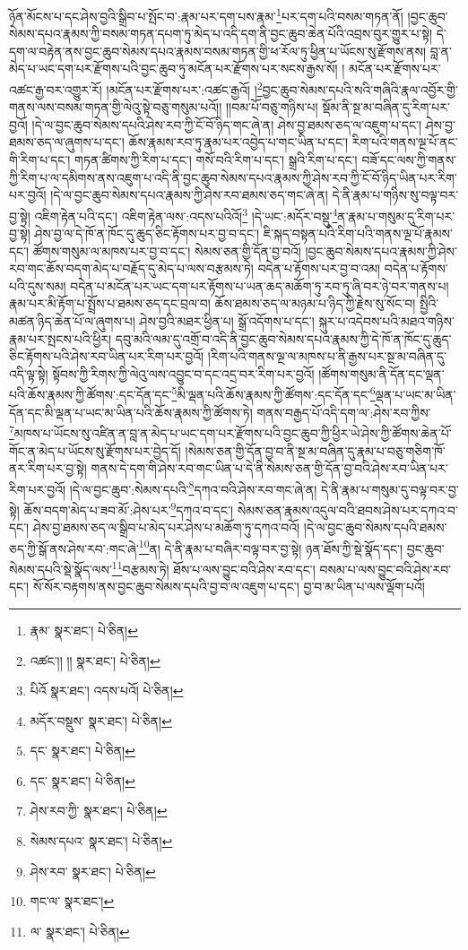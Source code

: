 ཉོན་མོངས་པ་དང་ཤེས་བྱའི་སྒྲིབ་པ་སྤོང་བ་:རྣམ་པར་དག་པས་རྣམ་\footnote{རྣམ་  སྣར་ཐང་།  པེ་ཅིན། }པར་དག་པའི་བསམ་གཏན་ནོ། །བྱང་ཆུབ་སེམས་དཔའ་རྣམས་ཀྱི་བསམ་གཏན་དཔག་ཏུ་མེད་པ་འདི་དག་ནི་བྱང་ཆུབ་ཆེན་པོའི་འབྲས་བུར་གྱུར་པ་སྟེ། དེ་དག་ལ་བརྟེན་ནས་བྱང་ཆུབ་སེམས་དཔའ་རྣམས་བསམ་གཏན་གྱི་ཕ་རོལ་ཏུ་ཕྱིན་པ་ཡོངས་སུ་རྫོགས་ནས། བླ་ན་མེད་པ་ཡང་དག་པར་རྫོགས་པའི་བྱང་ཆུབ་ཏུ་མངོན་པར་རྫོགས་པར་སངས་རྒྱས་སོ། །
མངོན་པར་རྫོགས་པར་འཚང་རྒྱ་བར་འགྱུར་རོ། །མངོན་པར་རྫོགས་པར་:འཚང་རྒྱའོ། །\footnote{འཚང་།། །།  སྣར་ཐང་།  པེ་ཅིན། }བྱང་ཆུབ་སེམས་དཔའི་སའི་གཞིའི་རྣལ་འབྱོར་གྱི་གནས་ལས་བསམ་གཏན་གྱི་ལེའུ་སྟེ་བཅུ་གསུམ་པའོ།། །།བམ་པོ་བཅུ་གཉིས་པ། སྡོམ་ནི་སྔ་མ་བཞིན་དུ་རིག་པར་བྱའོ། །དེ་ལ་བྱང་ཆུབ་སེམས་དཔའི་ཤེས་རབ་ཀྱི་ངོ་བོ་ཉིད་གང་ཞེ་ན། ཤེས་བྱ་ཐམས་ཅད་ལ་འཇུག་པ་དང་། ཤེས་བྱ་ཐམས་ཅད་ལ་ཞུགས་པ་དང་། ཆོས་རྣམས་རབ་ཏུ་རྣམ་པར་འབྱེད་པ་གང་ཡིན་པ་དང་། རིག་པའི་གནས་ལྔ་པོ་ནང་གི་རིག་པ་དང་། གཏན་ཚིགས་ཀྱི་རིག་པ་དང་། གསོ་བའི་རིག་པ་དང་། སྒྲའི་རིག་པ་དང་། བཟོ་དང་ལས་ཀྱི་གནས་ཀྱི་རིག་པ་ལ་དམིགས་ནས་འཇུག་པ་འདི་ནི་བྱང་ཆུབ་སེམས་དཔའ་རྣམས་ཀྱི་ཤེས་རབ་ཀྱི་ངོ་བོ་ཉིད་ཡིན་པར་རིག་པར་བྱའོ། །དེ་ལ་བྱང་ཆུབ་སེམས་དཔའ་རྣམས་ཀྱི་ཤེས་རབ་ཐམས་ཅད་གང་ཞེ་ན། དེ་ནི་རྣམ་པ་གཉིས་སུ་བལྟ་བར་བྱ་སྟེ། འཇིག་རྟེན་པའི་དང་། འཇིག་རྟེན་ལས་:འདས་པའིའོ།\footnote{པིའོ  སྣར་ཐང་། འདས་པའོ།  པེ་ཅིན། } །དེ་ཡང་:མདོར་བསྡུ་\footnote{མདོར་བསྡུས་  སྣར་ཐང་།  པེ་ཅིན། }ན་རྣམ་པ་གསུམ་དུ་རིག་པར་བྱ་སྟེ། ཤེས་བྱ་ལ་དེ་ཁོ་ན་ཁོང་དུ་ཆུད་ཅིང་རྟོགས་པར་བྱ་བ་དང་། ཇི་སྐད་བསྟན་པའི་རིག་པའི་གནས་ལྔ་པོ་རྣམས་དང་། ཚོགས་གསུམ་ལ་མཁས་པར་བྱ་བ་དང་། སེམས་ཅན་གྱི་དོན་བྱ་བའོ། །བྱང་ཆུབ་སེམས་དཔའ་རྣམས་ཀྱི་ཤེས་རབ་གང་ཆོས་བདག་མེད་པ་བརྗོད་དུ་མེད་པ་ལས་བརྩམས་ཏེ། བདེན་པ་རྟོགས་པར་བྱ་བ་འམ། བདེན་པ་རྟོགས་པའི་དུས་སམ། བདེན་པ་མངོན་པར་ཡང་དག་པར་རྟོགས་པ་ཡན་ཆད་མཆོག་ཏུ་རབ་ཏུ་ཞི་བར་ཉེ་བར་གནས་པ། རྣམ་པར་མི་རྟོག་པ་སྤྲོས་པ་ཐམས་ཅད་དང་བྲལ་བ། ཆོས་ཐམས་ཅད་ལ་མཉམ་པ་ཉིད་ཀྱི་རྗེས་སུ་སོང་བ། སྤྱིའི་མཚན་ཉིད་ཆེན་པོ་ལ་ཞུགས་པ། ཤེས་བྱའི་མཐར་ཕྱིན་པ། སྒྲོ་འདོགས་པ་དང་། སྐུར་པ་འདེབས་པའི་མཐའ་གཉིས་རྣམ་པར་སྤངས་པའི་ཕྱིར། དབུ་མའི་ལམ་དུ་འགྲོ་བ་འདི་ནི་བྱང་ཆུབ་སེམས་དཔའ་རྣམས་ཀྱི་དེ་ཁོ་ན་ཁོང་དུ་ཆུད་ཅིང་རྟོགས་པའི་ཤེས་རབ་ཡིན་པར་རིག་པར་བྱའོ། །རིག་པའི་གནས་ལྔ་ལ་མཁས་པ་ནི་རྒྱས་པར་སྔ་མ་བཞིན་དུ་འདི་ལྟ་སྟེ། སྟོབས་ཀྱི་རིགས་ཀྱི་ལེའུ་ལས་འབྱུང་བ་དང་འདྲ་བར་རིག་པར་བྱའོ། །ཚོགས་གསུམ་ནི་དོན་དང་ལྡན་པའི་ཆོས་རྣམས་ཀྱི་ཚོགས་:དང་དོན་དང་\footnote{དང་  སྣར་ཐང་།  པེ་ཅིན། }མི་ལྡན་པའི་ཆོས་རྣམས་ཀྱི་ཚོགས་:དང་དོན་དང་\footnote{དང་  སྣར་ཐང་།  པེ་ཅིན། }ལྡན་པ་ཡང་མ་ཡིན་དོན་དང་མི་ལྡན་པ་ཡང་མ་ཡིན་པའི་ཆོས་རྣམས་ཀྱི་ཚོགས་ཏེ། གནས་བརྒྱད་པོ་འདི་དག་ལ་:ཤེས་རབ་ཀྱིས་\footnote{ཤེས་རབ་ཀྱི་  སྣར་ཐང་།  པེ་ཅིན། }མཁས་པ་ཡོངས་སུ་འཛིན་ན་བླ་ན་མེད་པ་ཡང་དག་པར་རྫོགས་པའི་བྱང་ཆུབ་ཀྱི་ཕྱིར་ཡེ་ཤེས་ཀྱི་ཚོགས་ཆེན་པོ་གོང་ན་མེད་པ་ཡོངས་སུ་རྫོགས་པར་བྱེད་དོ། །སེམས་ཅན་གྱི་དོན་བྱ་བ་ནི་སྔ་མ་བཞིན་དུ་རྣམ་པ་བཅུ་གཅིག་ཁོ་ནར་རིག་པར་བྱ་སྟེ། གནས་དེ་དག་གི་ཤེས་རབ་གང་ཡིན་པ་དེ་ནི་སེམས་ཅན་གྱི་དོན་བྱ་བའི་ཤེས་རབ་ཡིན་པར་རིག་པར་བྱའོ། །དེ་ལ་བྱང་ཆུབ་:སེམས་དཔའི་\footnote{སེམས་དཔའ་  སྣར་ཐང་།  པེ་ཅིན། }དཀའ་བའི་ཤེས་རབ་གང་ཞེ་ན། དེ་ནི་རྣམ་པ་གསུམ་དུ་བལྟ་བར་བྱ་སྟེ། ཆོས་བདག་མེད་པ་ཟབ་མོ་:ཤེས་པར་\footnote{ཤེས་རབ་  སྣར་ཐང་།  པེ་ཅིན། }དཀའ་བ་དང་། སེམས་ཅན་རྣམས་འདུལ་བའི་ཐབས་ཤེས་པར་དཀའ་བ་དང་། ཤེས་བྱ་ཐམས་ཅད་ལ་སྒྲིབ་པ་མེད་པར་ཤེས་པ་མཆོག་ཏུ་དཀའ་བའོ། །དེ་ལ་བྱང་ཆུབ་སེམས་དཔའི་ཐམས་ཅད་ཀྱི་སྒོ་ནས་ཤེས་རབ་:གང་ཞེ་\footnote{གང་ལ་  སྣར་ཐང་། }ན། དེ་ནི་རྣམ་པ་བཞིར་བལྟ་བར་བྱ་སྟེ། ཉན་ཐོས་ཀྱི་སྡེ་སྣོད་དང་། བྱང་ཆུབ་སེམས་དཔའི་སྡེ་སྣོད་ལས་\footnote{ལ་  སྣར་ཐང་།  པེ་ཅིན། }བརྩམས་ཏེ། ཐོས་པ་ལས་བྱུང་བའི་ཤེས་རབ་དང་། བསམ་པ་ལས་བྱུང་བའི་ཤེས་རབ་དང་། སོ་སོར་བརྟགས་ནས་བྱང་ཆུབ་སེམས་དཔའི་བྱ་བ་ལ་འཇུག་པ་དང་། བྱ་བ་མ་ཡིན་པ་ལས་ལྡོག་པའོ། 